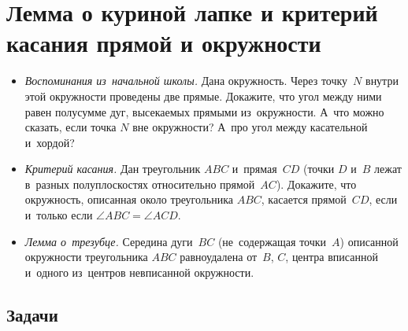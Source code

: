 
\section*{Лемма о куриной лапке и критерий касания прямой и окружности}


\begin{itemize}

\item\emph{Воспоминания из~начальной школы.}
Дана окружность.
Через точку~$N$ внутри этой окружности проведены две прямые.
Докажите, что угол между ними равен полусумме дуг, высекаемых прямыми
из~окружности.
А~что можно сказать, если точка $N$ вне окружности?
А~про угол между касательной и~хордой?

\item\emph{Критерий касания.}
Дан треугольник $ABC$ и~прямая~$CD$
(точки $D$ и~$B$ лежат в~разных полуплоскостях относительно прямой~$AC$).
Докажите, что окружность, описанная около треугольника $ABC$, касается
прямой~$CD$, если и~только если $\angle ABC = \angle ACD$.

\item\emph{Лемма о~трезубце.}
Середина дуги~$BC$ (не~содержащая точки~$A$) описанной окружности треугольника
$ABC$ равноудалена от~$B$, $C$, центра вписанной и~одного из~центров
невписанной окружности.

\end{itemize}


\subsection*{Задачи}

